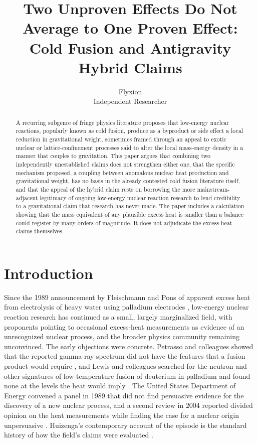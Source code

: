 \documentclass[11pt]{article}
\title{Two Unproven Effects Do Not Average to One Proven Effect: Cold Fusion and Antigravity Hybrid Claims}
\author{Flyxion \\ \small Independent Researcher}
\date{}
\begin{document}
\maketitle

\begin{abstract}
A recurring subgenre of fringe physics literature proposes that low-energy nuclear reactions, popularly known as cold fusion, produce as a byproduct or side effect a local reduction in gravitational weight, sometimes framed through an appeal to exotic nuclear or lattice-confinement processes said to alter the local mass-energy density in a manner that couples to gravitation. This paper argues that combining two independently unestablished claims does not strengthen either one, that the specific mechanism proposed, a coupling between anomalous nuclear heat production and gravitational weight, has no basis in the already contested cold fusion literature itself, and that the appeal of the hybrid claim rests on borrowing the more mainstream-adjacent legitimacy of ongoing low-energy nuclear reaction research to lend credibility to a gravitational claim that research has never made. The paper includes a calculation showing that the mass equivalent of any plausible excess heat is smaller than a balance could register by many orders of magnitude. It does not adjudicate the excess heat claims themselves.
\end{abstract}

\section{Introduction}

Since the 1989 announcement by Fleischmann and Pons of apparent excess heat from electrolysis of heavy water using palladium electrodes \cite{FP1989}, low-energy nuclear reaction research has continued as a small, largely marginalized field, with proponents pointing to occasional excess-heat measurements as evidence of an unrecognized nuclear process, and the broader physics community remaining unconvinced. The early objections were concrete. Petrasso and colleagues showed that the reported gamma-ray spectrum did not have the features that a fusion product would require \cite{P1989}, and Lewis and colleagues searched for the neutron and other signatures of low-temperature fusion of deuterium in palladium and found none at the levels the heat would imply \cite{L1989}. The United States Department of Energy convened a panel in 1989 that did not find persuasive evidence for the discovery of a new nuclear process, and a second review in 2004 reported divided opinion on the heat measurements while finding the case for a nuclear origin unpersuasive \cite{DOE1989,DOE2004}. Huizenga's contemporary account of the episode is the standard history of how the field's claims were evaluated \cite{H1993}.
\end{document}
